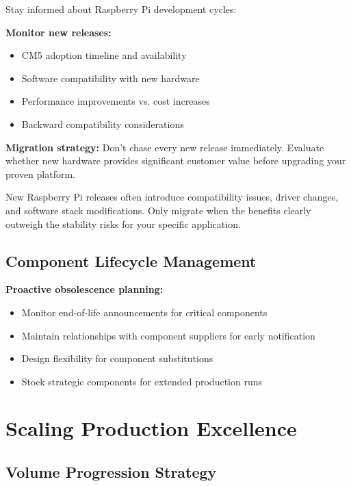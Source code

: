 Stay informed about Raspberry Pi development cycles:

\textbf{Monitor new releases:}
\begin{itemize}
\item CM5 adoption timeline and availability
\item Software compatibility with new hardware
\item Performance improvements vs. cost increases
\item Backward compatibility considerations
\end{itemize}

\textbf{Migration strategy:}
Don't chase every new release immediately. Evaluate whether new hardware provides significant customer value before upgrading your proven platform.

\begin{tcolorbox}[colback=yellow!10,colframe=orange!75!black,title=Technology Transition Risk]
New Raspberry Pi releases often introduce compatibility issues, driver changes, and software stack modifications. Only migrate when the benefits clearly outweigh the stability risks for your specific application.
\end{tcolorbox}

\subsection{Component Lifecycle Management}

\textbf{Proactive obsolescence planning:}
\begin{itemize}
\item Monitor end-of-life announcements for critical components
\item Maintain relationships with component suppliers for early notification
\item Design flexibility for component substitutions
\item Stock strategic components for extended production runs
\end{itemize}

\section{Scaling Production Excellence}

\subsection{Volume Progression Strategy}

